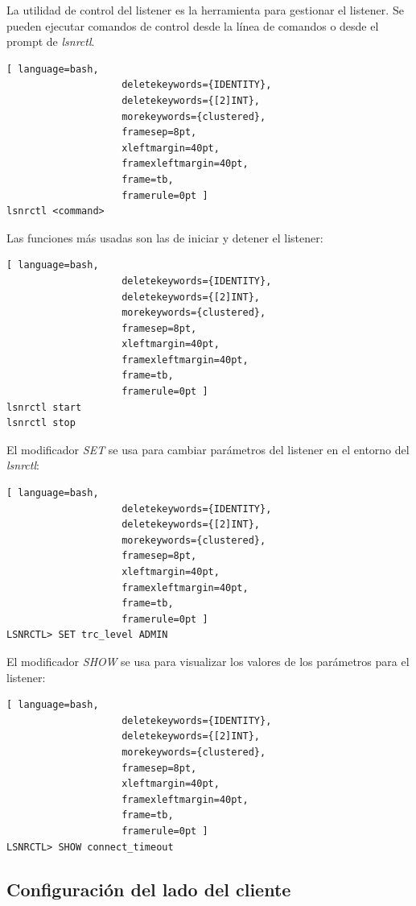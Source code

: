 La utilidad de control del listener es la herramienta para gestionar el listener. Se pueden ejecutar comandos de control desde la línea de comandos o desde el prompt de \textit{lsnrctl}. 
\begin{lstlisting}[ language=bash,
                    deletekeywords={IDENTITY},
                    deletekeywords={[2]INT},
                    morekeywords={clustered},
                    framesep=8pt,
                    xleftmargin=40pt,
                    framexleftmargin=40pt,
                    frame=tb,
                    framerule=0pt ]
lsnrctl <command>
\end{lstlisting}
Las funciones más usadas son las de iniciar y detener el listener:
\begin{lstlisting}[ language=bash,
                    deletekeywords={IDENTITY},
                    deletekeywords={[2]INT},
                    morekeywords={clustered},
                    framesep=8pt,
                    xleftmargin=40pt,
                    framexleftmargin=40pt,
                    frame=tb,
                    framerule=0pt ]
lsnrctl start
lsnrctl stop
\end{lstlisting}
El modificador \textit{SET} se usa para cambiar parámetros del listener en el entorno del \textit{lsnrctl}:
\begin{lstlisting}[ language=bash,
                    deletekeywords={IDENTITY},
                    deletekeywords={[2]INT},
                    morekeywords={clustered},
                    framesep=8pt,
                    xleftmargin=40pt,
                    framexleftmargin=40pt,
                    frame=tb,
                    framerule=0pt ]
LSNRCTL> SET trc_level ADMIN
\end{lstlisting}
El modificador \textit{SHOW} se usa para visualizar los valores de los parámetros para el listener:
\begin{lstlisting}[ language=bash,
                    deletekeywords={IDENTITY},
                    deletekeywords={[2]INT},
                    morekeywords={clustered},
                    framesep=8pt,
                    xleftmargin=40pt,
                    framexleftmargin=40pt,
                    frame=tb,
                    framerule=0pt ]
LSNRCTL> SHOW connect_timeout
\end{lstlisting}

\subsection{Configuración del lado del cliente}

